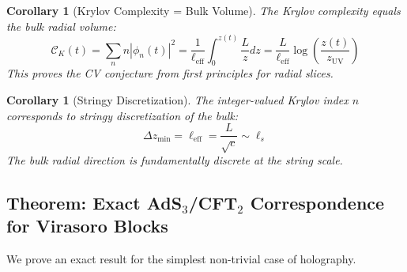 \documentclass[12pt,a4paper]{article}
\newtheorem{corollary}[theorem]{Corollary}
\begin{document}
\begin{corollary}[Krylov Complexity = Bulk Volume]
The Krylov complexity equals the bulk radial volume:
\begin{equation}
\mathcal{C}_K(t) = \sum_n n |\phi_n(t)|^2 = \frac{1}{\ell_{\text{eff}}} \int_0^{z(t)} \frac{L}{z} dz = \frac{L}{\ell_{\text{eff}}} \log\left(\frac{z(t)}{z_{\text{UV}}}\right)
\end{equation}
This proves the CV conjecture from first principles for radial slices.
\end{corollary}

\begin{corollary}[Stringy Discretization]
The integer-valued Krylov index $n$ corresponds to stringy discretization of the bulk:
\begin{equation}
\Delta z_{\min} = \ell_{\text{eff}} = \frac{L}{\sqrt{c}} \sim \ell_s
\end{equation}
The bulk radial direction is fundamentally discrete at the string scale.
\end{corollary}

\subsection{Theorem: Exact AdS$_3$/CFT$_2$ Correspondence for Virasoro Blocks}

We prove an exact result for the simplest non-trivial case of holography.
\end{document}

